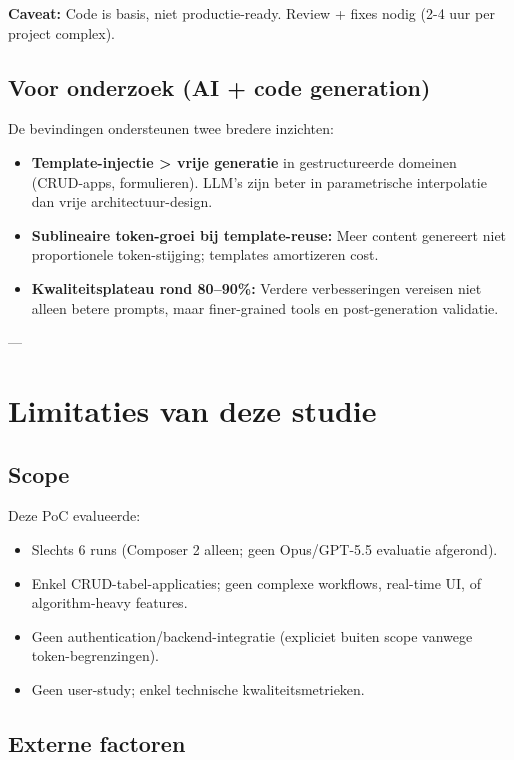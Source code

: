 \noindent
\textbf{Caveat:} Code is basis, niet productie-ready. Review + fixes nodig (2-4 uur per project complex).

\subsection{Voor onderzoek (AI + code generation)}

De bevindingen ondersteunen twee bredere inzichten:

\begin{itemize}
  \item \textbf{Template-injectie > vrije generatie} in gestructureerde domeinen (CRUD-apps, formulieren). LLM's zijn beter in parametrische interpolatie dan vrije architectuur-design.
  
  \item \textbf{Sublineaire token-groei bij template-reuse:} Meer content genereert niet proportionele token-stijging; templates amortizeren cost.
  
  \item \textbf{Kwaliteitsplateau rond 80–90\%:} Verdere verbesseringen vereisen niet alleen betere prompts, maar finer-grained tools en post-generation validatie.
\end{itemize}

---

\section{Limitaties van deze studie}

\subsection{Scope}

Deze PoC evalueerde:
\begin{itemize}
  \item Slechts 6 runs (Composer 2 alleen; geen Opus/GPT-5.5 evaluatie afgerond).
  \item Enkel CRUD-tabel-applicaties; geen complexe workflows, real-time UI, of algorithm-heavy features.
  \item Geen authentication/backend-integratie (expliciet buiten scope vanwege token-begrenzingen).
  \item Geen user-study; enkel technische kwaliteitsmetrieken.
\end{itemize}

\subsection{Externe factoren}


